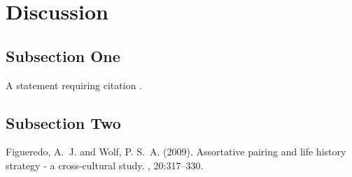 \documentclass[twoside,twocolumn]{article}
\begin{document}

\section{Discussion}

\subsection{Subsection One}

A statement requiring citation \cite{Figueredo:2009dg}.
\blindtext %

\subsection{Subsection Two}

\blindtext %


\begin{thebibliography}{99} %

Figueredo, A.~J. and Wolf, P. S.~A. (2009).
\newblock Assortative pairing and life history strategy - a cross-cultural
  study.
, 20:317--330.

\end{thebibliography}

\end{document}
